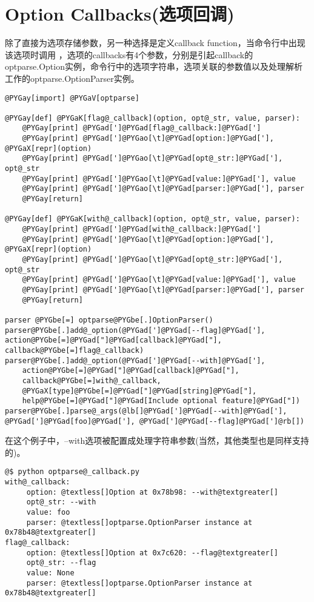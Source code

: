 \documentclass[a4paper,10pt,english]{manual}
\begin{document}
\section{Option Callbacks(选项回调)}

除了直接为选项存储参数，另一种选择是定义callback function，当命令行中出现该选项时调用 ，选项的callbacks有4个参数，分别是引起callback的optparse.Option实例，命令行中的选项字符串，选项关联的参数值以及处理解析工作的optparse.OptionParser实例。

\begin{Verbatim}[commandchars=@\[\]]
@PYGay[import] @PYGaV[optparse]

@PYGay[def] @PYGaK[flag@_callback](option, opt@_str, value, parser):
    @PYGay[print] @PYGad[']@PYGad[flag@_callback:]@PYGad[']
    @PYGay[print] @PYGad[']@PYGao[\t]@PYGad[option:]@PYGad['], @PYGaX[repr](option)
    @PYGay[print] @PYGad[']@PYGao[\t]@PYGad[opt@_str:]@PYGad['], opt@_str
    @PYGay[print] @PYGad[']@PYGao[\t]@PYGad[value:]@PYGad['], value
    @PYGay[print] @PYGad[']@PYGao[\t]@PYGad[parser:]@PYGad['], parser
    @PYGay[return]

@PYGay[def] @PYGaK[with@_callback](option, opt@_str, value, parser):
    @PYGay[print] @PYGad[']@PYGad[with@_callback:]@PYGad[']
    @PYGay[print] @PYGad[']@PYGao[\t]@PYGad[option:]@PYGad['], @PYGaX[repr](option)
    @PYGay[print] @PYGad[']@PYGao[\t]@PYGad[opt@_str:]@PYGad['], opt@_str
    @PYGay[print] @PYGad[']@PYGao[\t]@PYGad[value:]@PYGad['], value
    @PYGay[print] @PYGad[']@PYGao[\t]@PYGad[parser:]@PYGad['], parser
    @PYGay[return]

parser @PYGbe[=] optparse@PYGbe[.]OptionParser()
parser@PYGbe[.]add@_option(@PYGad[']@PYGad[--flag]@PYGad['], action@PYGbe[=]@PYGad["]@PYGad[callback]@PYGad["], callback@PYGbe[=]flag@_callback)
parser@PYGbe[.]add@_option(@PYGad[']@PYGad[--with]@PYGad['],
    action@PYGbe[=]@PYGad["]@PYGad[callback]@PYGad["],
    callback@PYGbe[=]with@_callback,
    @PYGaX[type]@PYGbe[=]@PYGad["]@PYGad[string]@PYGad["],
    help@PYGbe[=]@PYGad["]@PYGad[Include optional feature]@PYGad["])
parser@PYGbe[.]parse@_args(@lb[]@PYGad[']@PYGad[--with]@PYGad['], @PYGad[']@PYGad[foo]@PYGad['], @PYGad[']@PYGad[--flag]@PYGad[']@rb[])
\end{Verbatim}

在这个例子中，--with选项被配置成处理字符串参数(当然，其他类型也是同样支持的)。

\begin{Verbatim}[commandchars=@\[\]]
@$ python optparse@_callback.py
with@_callback:
     option: @textless[]Option at 0x78b98: --with@textgreater[]
     opt@_str: --with
     value: foo
     parser: @textless[]optparse.OptionParser instance at 0x78b48@textgreater[]
flag@_callback:
     option: @textless[]Option at 0x7c620: --flag@textgreater[]
     opt@_str: --flag
     value: None
     parser: @textless[]optparse.OptionParser instance at 0x78b48@textgreater[]
\end{Verbatim}
\end{document}
